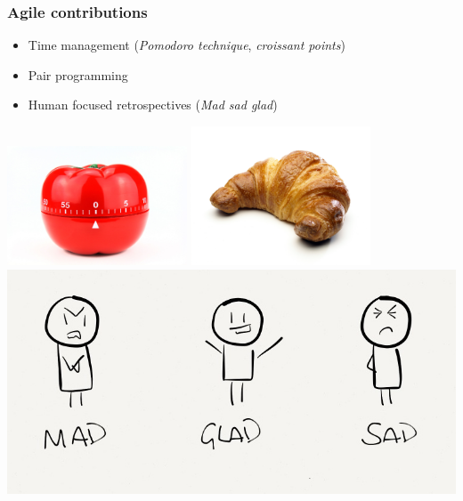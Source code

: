 \begin{FrameWithSubSection}
    \frametitle{Agile contributions}
    \begin{minipage}{0.49\textwidth}
        \begin{itemize}
            \item Time management (\emph{Pomodoro technique}, \emph{croissant points})
            \item Pair programming
            \item Human focused retrospectives (\emph{Mad sad glad})
        \end{itemize}
    \end{minipage}
    \begin{minipage}{0.40\textwidth}
        \flushright
        \includegraphics[width=0.40\textwidth]{./img/pomodoro.jpg} \hspace{0.2cm}
        \includegraphics[width=0.40\textwidth]{./img/croissant.jpg} \\
        \includegraphics[width=\textwidth]{../../report/src/img/mgs.png}
    \end{minipage}
\end{FrameWithSubSection}


